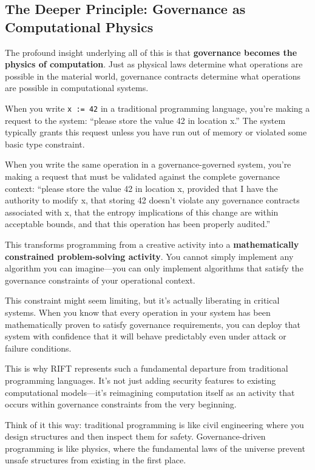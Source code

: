 \subsection{The Deeper Principle: Governance as Computational Physics}

The profound insight underlying all of this is that \textbf{governance becomes the physics of computation}. Just as physical laws determine what operations are possible in the material world, governance contracts determine what operations are possible in computational systems.

When you write \texttt{x := 42} in a traditional programming language, you're making a request to the system: ``please store the value 42 in location x.'' The system typically grants this request unless you have run out of memory or violated some basic type constraint.

When you write the same operation in a governance-governed system, you're making a request that must be validated against the complete governance context: ``please store the value 42 in location x, provided that I have the authority to modify x, that storing 42 doesn't violate any governance contracts associated with x, that the entropy implications of this change are within acceptable bounds, and that this operation has been properly audited.''

This transforms programming from a creative activity into a \textbf{mathematically constrained problem-solving activity}. You cannot simply implement any algorithm you can imagine—you can only implement algorithms that satisfy the governance constraints of your operational context.

This constraint might seem limiting, but it's actually liberating in critical systems. When you know that every operation in your system has been mathematically proven to satisfy governance requirements, you can deploy that system with confidence that it will behave predictably even under attack or failure conditions.

This is why RIFT represents such a fundamental departure from traditional programming languages. It's not just adding security features to existing computational models—it's reimagining computation itself as an activity that occurs within governance constraints from the very beginning.

Think of it this way: traditional programming is like civil engineering where you design structures and then inspect them for safety. Governance-driven programming is like physics, where the fundamental laws of the universe prevent unsafe structures from existing in the first place.